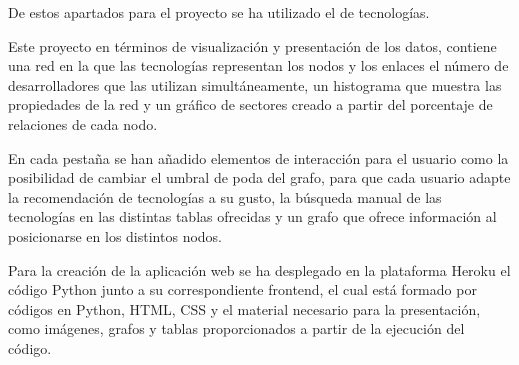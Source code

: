 De estos apartados para el proyecto se ha utilizado el de tecnologías.

Este proyecto en términos de visualización y presentación de los datos, contiene una red en la que las tecnologías representan los nodos y los enlaces el número de desarrolladores que las utilizan simultáneamente, un histograma que muestra las propiedades de la red y un gráfico de sectores creado a partir del porcentaje de relaciones de cada nodo. 

En cada pestaña se han añadido elementos de interacción para el usuario como la posibilidad de cambiar el umbral de poda del grafo, para que cada usuario adapte la recomendación de tecnologías a su gusto, la búsqueda manual de las tecnologías en las distintas tablas ofrecidas y un grafo que ofrece información al posicionarse en los distintos nodos.

Para la creación de la aplicación web se ha desplegado en la plataforma Heroku el código Python junto a su correspondiente frontend, el cual está formado por códigos en Python, HTML, CSS y el material necesario para la presentación, como imágenes, grafos y tablas proporcionados a partir de la ejecución del código.